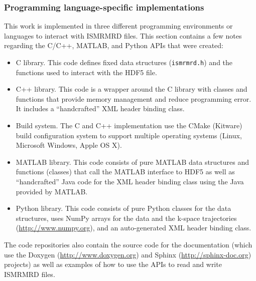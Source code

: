 \documentclass[12pt, draft]{article}
\begin{document}
\subsubsection*{Programming language-specific implementations}
This work is implemented in three different programming environments or languages to interact with ISMRMRD files. This section contains a few notes regarding the C/C++, MATLAB, and Python APIs that were created:
\begin{itemize}
\item{C library.}  This code defines fixed data structures (\texttt{ismrmrd.h}) and the functions used to interact with the HDF5 file.
\item{C++ library.} This code is a wrapper around the C library with classes and functions that provide memory management and reduce programming error.  It includes a ``handcrafted'' XML header binding class.  
\item{Build system.} The C and C++ implementation use the CMake (Kitware) build configuration system to support multiple operating systems (Linux, Microsoft Windows, Apple OS X).
\item{MATLAB library.} This code consists of pure MATLAB data structures and functions (classes) that call the MATLAB interface to HDF5 as well as ``handcrafted'' Java code for the XML header binding class using the Java provided by MATLAB.
\item{Python library.} This code consists of pure Python classes for the data structures, uses NumPy arrays for the data and the k-space trajectories (\url{http://www.numpy.org}), and an auto-generated XML header binding class.
\end{itemize}

The code repositories also contain the source code for the documentation (which use the Doxygen (\url{http://www.doxygen.org}) and Sphinx (\url{http://sphinx-doc.org}) projects) as well as examples of how to use the APIs to read and write ISMRMRD files.
\end{document}
